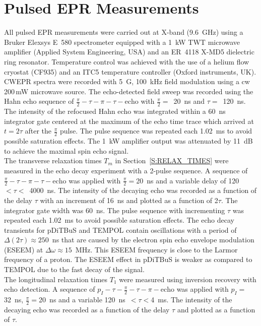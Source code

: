 \section*{Pulsed EPR Measurements}
\par
All pulsed EPR measurements were carried out at X-band (9.6~GHz) using a Bruker Elexsys E~580 spectrometer equipped with a 1~kW TWT microwave amplifier (Applied System Engineering, USA) and an ER~4118 X-MD5 dielectric ring resonator. Temperature control was achieved with the use of a helium flow cryostat (CF935) and an ITC5 temperature controller (Oxford instruments, UK). CWEPR spectra were recorded with 5~G, 100~kHz field modulation using a cw 200\,mW microwave source. The echo-detected field sweep was recorded using the Hahn echo sequence of $\frac{\pi}{2} - \tau - \pi - \tau - \textrm{echo}$ with $\frac{\pi}{2} =$~20~ns and $\tau =$~120~ns. The intensity of the refocused Hahn echo was integrated within a 60~ns integrator gate centered at the maximum of the echo time trace which arrived at $t=2\tau$ after the $\frac{\pi}{2}$ pulse. The pulse sequence was repeated each 1.02~ms to avoid possible saturation effects. The 1~kW amplifier output was attenuated by 11~dB to achieve the maximal spin echo signal.\\

The transverse relaxation times $T_m$ in Section~\ref{S:RELAX_TIMES} were measured in the echo decay experiment with a 2-pulse sequence. A sequence of $\frac{\pi}{2} - \tau - \pi - \tau - \textrm{echo}$ was applied with $\frac{\pi}{2} =$20~ns and a variable delay of 120~$<\tau<$~4000~ns. The intensity of the decaying echo was recorded as a function of the delay $\tau$ with an increment of 16~ns and plotted as a function of 2$\tau$. The integrator gate width was 60~ns. The pulse sequence with incrementing $\tau$ was repeated each 1.02~ms to avoid possible saturation effects. The echo decay transients for pDiTBuS and TEMPOL contain oscillations with a period of $\Delta (2\tau) \approx 250$~ns that are caused by the electron spin echo envelope modulation (ESEEM) at $\Delta\omega\approx 15$~MHz. This ESEEM frequency is close to the Larmor frequency of a proton. The ESEEM effect in pDiTBuS is weaker as compared to TEMPOL due to the fast decay of the signal.\\

The longitudinal relaxation times $T_1$ were measured using inversion recovery with echo detection. A sequence of $p_I - \tau - \frac{\pi}{2} - \tau - \pi - \textrm{echo}$ was applied with $p_I=$32~ns, $\frac{\pi}{2} =$20~ns and a variable 120~ns~$<\tau<$4~ms. The intensity of the decaying echo was recorded as a function of the delay $\tau$ and plotted as a function of $\tau$.

